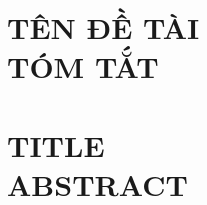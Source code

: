 \chapter*{TÊN ĐỀ TÀI\\TÓM TẮT}
\dotfill

\dotfill

\dotfill

\newpage

\chapter*{TITLE\\ABSTRACT}
\dotfill

\dotfill

\dotfill